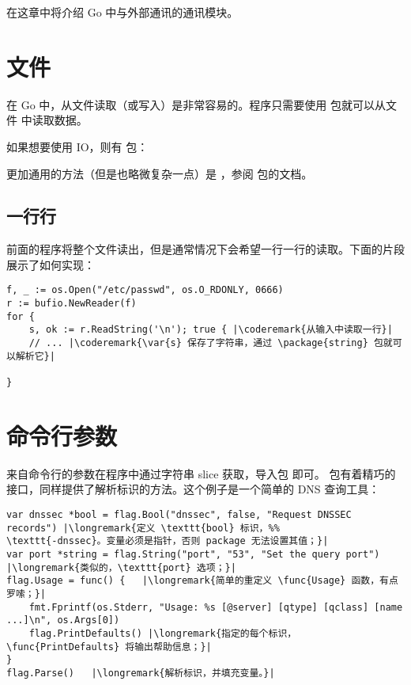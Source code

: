 \noindent{}在这章中将介绍 Go 中与外部通讯的通讯模块。

\section{文件}
在 Go 中，从文件读取（或写入）是非常容易的。程序只需要使用
 包就可以从文件  中读取数据。

\showremarks

如果想要使用 IO，则有
 包：

\showremarks

更加通用的方法（但是也略微复杂一点）是 ，参阅  包的文档。

\subsection{一行行}
前面的程序将整个文件读出，但是通常情况下会希望一行一行的读取。下面的片段展示了如何实现：

\begin{lstlisting}
f, _ := os.Open("/etc/passwd", os.O_RDONLY, 0666)
r := bufio.NewReader(f)
for {
    s, ok := r.ReadString('\n'); true { |\coderemark{从输入中读取一行}|
    // ... |\coderemark{\var{s} 保存了字符串，通过 \package{string} 包就可以解析它}|

}
\end{lstlisting}

\section{命令行参数}
\label{sec:option parsing}
来自命令行的参数在程序中通过字符串 slice  获取，导入包  即可。
 包有着精巧的接口，同样提供了解析标识的方法。这个例子是一个简单的 DNS 查询工具：
\begin{lstlisting}
var dnssec *bool = flag.Bool("dnssec", false, "Request DNSSEC records") |\longremark{定义 \texttt{bool} 标识，%%
\texttt{-dnssec}。变量必须是指针，否则 package 无法设置其值；}|
var port *string = flag.String("port", "53", "Set the query port")      |\longremark{类似的，\texttt{port} 选项；}|
flag.Usage = func() {   |\longremark{简单的重定义 \func{Usage} 函数，有点罗嗦；}|
    fmt.Fprintf(os.Stderr, "Usage: %s [@server] [qtype] [qclass] [name ...]\n", os.Args[0])
    flag.PrintDefaults() |\longremark{指定的每个标识，\func{PrintDefaults} 将输出帮助信息；}|
}
flag.Parse()   |\longremark{解析标识，并填充变量。}|
\end{lstlisting}
\showremarks

